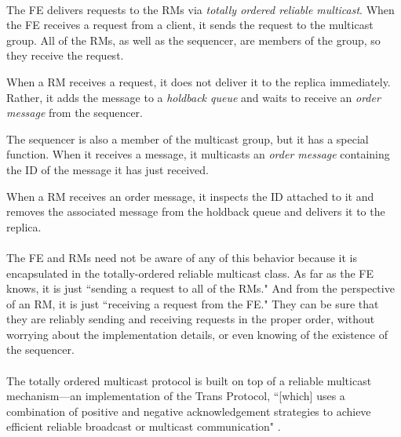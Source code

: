\documentclass{article}
\begin{document}
\paragraph{}

The FE delivers requests to the RMs via \emph{totally ordered reliable multicast}.
When the FE receives a request from a client, it sends the request to the multicast group.
All of the RMs, as well as the sequencer, are members of the group, so they receive the request.

When a RM receives a request, it does not deliver it to the replica immediately.
Rather, it adds the message to a \emph{holdback queue} and waits to receive an \emph{order message} from the sequencer.

The sequencer is also a member of the multicast group, but it has a special function.
When it receives a message, it multicasts an \emph{order message} containing the ID of the message it has just received.

When a RM receives an order message, it inspects the ID attached to it and removes the associated message from the holdback queue and delivers it to the replica.

\paragraph{}

The FE and RMs need not be aware of any of this behavior because it is encapsulated in the totally-ordered reliable multicast class.
As far as the FE knows, it is just ``sending a request to all of the RMs."
And from the perspective of an RM, it is just ``receiving a request from the FE."
They can be sure that they are reliably sending and receiving requests in the proper order, without worrying about the implementation details, or even knowing of the existence of the sequencer.

\paragraph{}

The totally ordered multicast protocol is built on top of a reliable multicast mechanism---an implementation of the Trans Protocol, ``[which] uses a combination of positive and negative acknowledgement strategies to achieve efficient reliable broadcast or multicast communication" \cite{melliar-smith-trans}.

\paragraph{}
\end{document}
